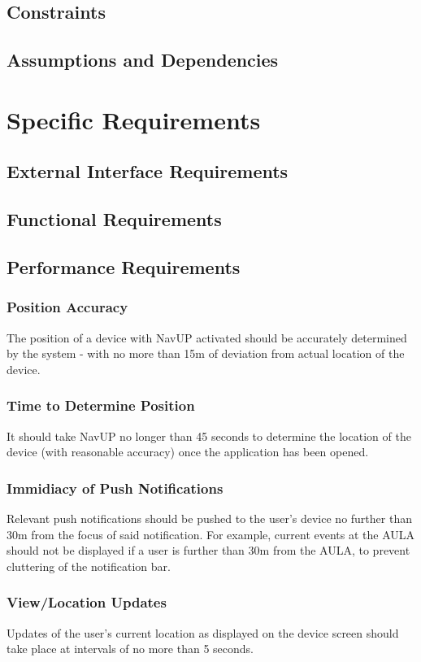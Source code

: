 \documentclass[12pt, a4paper]{article}
\begin{document}
	\subsection{Constraints}
	\subsection{Assumptions and Dependencies}

\section{Specific Requirements}
	\subsection{External Interface Requirements}
	\subsection{Functional Requirements}
	\subsection{Performance Requirements}
		\subsubsection{Position Accuracy} The position of a device with NavUP activated should be accurately determined by the system - with no more than 15m of deviation from actual location of the device.
		\subsubsection{Time to Determine Position} It should take NavUP no longer than 45 seconds to determine the location of the device (with reasonable accuracy) once the application has been opened.
		\subsubsection{Immidiacy of Push Notifications} Relevant push notifications should be pushed to the user's device no further than 30m from the focus of said notification. For example, current events at the AULA should not be displayed if a user is further than 30m from the AULA, to prevent cluttering of the notification bar.
		\subsubsection{View/Location Updates} Updates of the user's current location as displayed on the device screen should take place at intervals of no more than 5 seconds.
\end{document}
